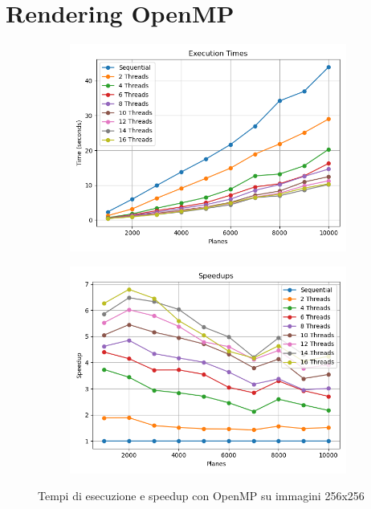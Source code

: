 \section{Rendering OpenMP}\label{sec:rendering-openmp}
\begin{figure}[H]
    \centering
    \begin{subfigure}{0.49\textwidth}
        \centering
        \includegraphics[width=\textwidth]{../result_16/csv/test10000/plots/256/results_times}
    \end{subfigure}
    \begin{subfigure}{0.49\textwidth}
        \centering
        \includegraphics[width=\textwidth]{../result_16/csv/test10000/plots/256/results_speedup}
    \end{subfigure}
    \caption{Tempi di esecuzione e speedup con OpenMP su immagini 256x256}
    \label{fig:omp_10000_256}
\end{figure}
